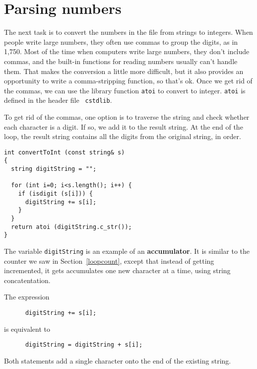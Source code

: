 \section{Parsing numbers}

The next task is to convert the numbers in the file from strings to
integers.  When people write large numbers, they often use commas to
group the digits, as in 1,750.  Most of the time when computers write
large numbers, they don't include commas, and the built-in functions
for reading numbers usually can't handle them.  That makes the
conversion a little more difficult, but it also provides an
opportunity to write a comma-stripping function, so that's ok.  Once
we get rid of the commas, we can use the library function {\tt atoi}
to convert to integer.  {\tt atoi} is defined in the header file {\tt
cstdlib}.


To get rid of the commas, one option is to traverse the string and
check whether each character is a digit.  If so, we add it to the
result string.  At the end of the loop, the result string contains all
the digits from the original string, in order.

\begin{verbatim}
int convertToInt (const string& s)
{
  string digitString = "";

  for (int i=0; i<s.length(); i++) {
    if (isdigit (s[i])) {
      digitString += s[i];
    }
  }
  return atoi (digitString.c_str());
}
\end{verbatim}
%
The variable {\tt digitString} is an example of an {\bf accumulator}.  It is
similar to the counter we saw in Section~\ref{loopcount},
except that instead of getting incremented, it gets accumulates
one new character at a time, using string concatentation.

The expression

\begin{verbatim}
      digitString += s[i];
\end{verbatim}
%
is equivalent to

\begin{verbatim}
      digitString = digitString + s[i];
\end{verbatim}
%
Both statements add a single character onto the end of the existing
string.


